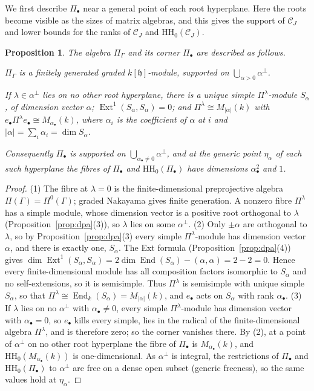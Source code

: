 \documentclass[11pt]{amsart}
\numberwithin{table}{section}
\numberwithin{figure}{section}
\numberwithin{equation}{section}
\newtheorem{prop}[thm]{Proposition}
\theoremstyle{definition}
\theoremstyle{plain}
\newcommand{\cC}{\mathcal{C}}
\newcommand{\h}{\mathfrak{h}}
\newcommand{\bul}{\bullet}
\newcommand{\HH}{\mathrm{HH}}
\DeclareMathOperator{\End}{End}
\DeclareMathOperator{\Ext}{Ext}
\begin{document}
We first describe $\Pi_\bul$ near a general point of each root hyperplane. Here the roots become visible as the sizes of matrix algebras, and this gives the support of $\cC_J$ and lower bounds for the ranks of $\cC_J$ and $\HH_0(\cC_J)$.

\begin{prop}\label{prop:generic}
The algebra $\Pi_\Gamma$ and its corner $\Pi_\bul$ are described as follows.
\begin{thmlist}
\item $\Pi_\Gamma$ is a finitely generated graded $k[\h]$-module, supported on $\bigcup_{\alpha>0} \alpha^\perp$.
\item If $\lambda \in \alpha^\perp$ lies on no other root hyperplane, there is a unique simple $\Pi^\lambda$-module $S_\alpha$, of dimension vector $\alpha$; $\Ext^1(S_\alpha, S_\alpha) = 0$; and $\Pi^\lambda \cong M_{|\alpha|}(k)$ with $e_\bul\Pi^\lambda e_\bul \cong M_{\alpha_\bul}(k)$, where $\alpha_i$ is the coefficient of $\alpha$ at $i$ and $|\alpha| = \sum_i \alpha_i = \dim S_\alpha$.
\item Consequently $\Pi_\bul$ is supported on $\bigcup_{\alpha_\bul \neq 0} \alpha^\perp$, and at the generic point $\eta_\alpha$ of each such hyperplane the fibres of $\Pi_\bul$ and $\HH_0(\Pi_\bul)$ have dimensions $\alpha_\bul^2$ and $1$.
\end{thmlist}
\end{prop}

\begin{proof}
(1) The fibre at $\lambda = 0$ is the finite-dimensional preprojective algebra $\Pi(\Gamma) = \Pi^0(\Gamma)$; graded Nakayama gives finite generation. A nonzero fibre $\Pi^\lambda$ has a simple module, whose dimension vector is a positive root orthogonal to $\lambda$ (Proposition~\ref{prop:dpa}(3)), so $\lambda$ lies on some $\alpha^\perp$. (2) Only $\pm\alpha$ are orthogonal to $\lambda$, so by Proposition~\ref{prop:dpa}(3) every simple $\Pi^\lambda$-module has dimension vector $\alpha$, and there is exactly one, $S_\alpha$. The Ext formula (Proposition~\ref{prop:dpa}(4)) gives $\dim \Ext^1(S_\alpha, S_\alpha) = 2\dim\End(S_\alpha) - (\alpha, \alpha) = 2 - 2 = 0$. Hence every finite-dimensional module has all composition factors isomorphic to $S_\alpha$ and no self-extensions, so it is semisimple. Thus $\Pi^\lambda$ is semisimple with unique simple $S_\alpha$, so that $\Pi^\lambda \cong \End_k(S_\alpha) = M_{|\alpha|}(k)$, and $e_\bul$ acts on $S_\alpha$ with rank $\alpha_\bul$. (3) If $\lambda$ lies on no $\alpha^\perp$ with $\alpha_\bul \neq 0$, every simple $\Pi^\lambda$-module has dimension vector with $\alpha_\bul = 0$, so $e_\bul$ kills every simple, lies in the radical of the finite-dimensional algebra $\Pi^\lambda$, and is therefore zero; so the corner vanishes there. By (2), at a point of $\alpha^\perp$ on no other root hyperplane the fibre of $\Pi_\bul$ is $M_{\alpha_\bul}(k)$, and $\HH_0(M_{\alpha_\bul}(k))$ is one-dimensional. As $\alpha^\perp$ is integral, the restrictions of $\Pi_\bul$ and $\HH_0(\Pi_\bul)$ to $\alpha^\perp$ are free on a dense open subset (generic freeness), so the same values hold at $\eta_\alpha$.
\end{proof}
\end{document}
